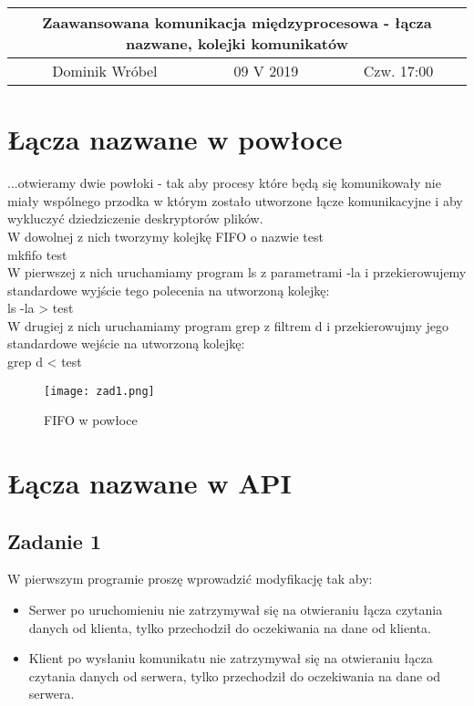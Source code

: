 \documentclass[a4paper,15pt]{article}
\newcommand{\assignment}[2]{
    \begin{tcolorbox}[colback=black!5!white,colframe=black,title={Zadanie #1}]
        #2
    \end{tcolorbox}
}
\begin{document}
\begin{table}
\begin{center}
\begin{tabular}{|c|c|c|}
\hline
\multicolumn{3}{|c|}{\textbf{Zaawansowana komunikacja międzyprocesowa - łącza nazwane, kolejki komunikatów}} \\ \hline Dominik Wróbel & 09 V 2019 & Czw. 17:00 \\ \hline

\end{tabular}
\end{center}
\end{table}

\tableofcontents

\newpage
\section{Łącza nazwane w powłoce}


\assignment{ - Łącza nazwane w powłoce}{ 
...otwieramy dwie powłoki - tak aby procesy które będą się komunikowały nie miały wspólnego przodka w którym zostało utworzone łącze komunikacyjne i aby wykluczyć dziedziczenie deskryptorów plików. \\
W dowolnej z nich tworzymy kolejkę FIFO o nazwie test \\
mkfifo test \\
W pierwszej z nich uruchamiamy program ls z parametrami -la i przekierowujemy standardowe wyjście tego polecenia na utworzoną kolejkę: \\
ls -la > test \\
W drugiej z nich uruchamiamy program grep z filtrem d i przekierowujmy jego standardowe wejście na utworzoną kolejkę: \\
grep d < test
}


\begin{figure}[H]
\centerline{\texttt{[image: zad1.png]}}
\caption{FIFO w powłoce}
\label{fig:nazwane}
\end{figure}


\section{Łącza nazwane w API}

\subsection{Zadanie 1}

\assignment{1}{ 
W pierwszym programie proszę wprowadzić modyfikację tak aby:
\begin{itemize}
\item Serwer po uruchomieniu nie zatrzymywał się na otwieraniu łącza czytania danych od klienta, tylko przechodził do oczekiwania na dane od klienta.
\item Klient po wysłaniu komunikatu nie zatrzymywał się na otwieraniu łącza czytania danych od serwera, tylko przechodził do oczekiwania na dane od serwera.
\end{itemize}
}
\end{document}
